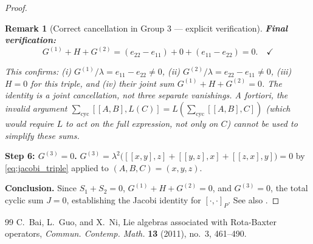 \documentclass[10pt,a4paper]{amsart}
\newtheorem{remark}{Remark}
\begin{document}
\begin{proof}
\begin{remark}[Correct cancellation in Group 3 --- explicit verification]
\medskip
\noindent\textbf{Final verification:}
\[
G^{(1)}+H+G^{(2)} = (e_{22}-e_{11}) + 0 + (e_{11}-e_{22}) = 0. \quad\checkmark
\]

This confirms: (i) $G^{(1)}/\lambda = e_{11}-e_{22} \neq 0$,
(ii) $G^{(2)}/\lambda = e_{22}-e_{11} \neq 0$,
(iii) $H = 0$ for this triple, and (iv) their joint sum $G^{(1)}+H+G^{(2)}=0$.
The identity is a \emph{joint} cancellation, not three separate vanishings.
A fortiori, the invalid argument
$\sum_{\mathrm{cyc}}[[A,B],L(C)] = L(\sum_{\mathrm{cyc}}[[A,B],C])$ (which would
require $L$ to act on the full expression, not only on $C$) cannot be used to simplify
these sums.
\end{remark}

\textbf{Step 6: $G^{(3)}=0$.}
$G^{(3)} = \lambda^2\bigl([[x,y],z]+[[y,z],x]+[[z,x],y]\bigr) = 0$
by \eqref{eq:jacobi_triple} applied to $(A,B,C)=(x,y,z)$.

\medskip
\textbf{Conclusion.} Since $S_1+S_2=0$, $G^{(1)}+H+G^{(2)}=0$, and $G^{(3)}=0$,
the total cyclic sum $J=0$, establishing the Jacobi identity for $[\cdot,\cdot]_P$.
See also \cite[Theorem~3.3]{BaiGuoNi2011}.
\end{proof}

\begin{thebibliography}{99}
 C.~Bai, L.~Guo, and X.~Ni, Lie algebras associated with Rota-Baxter operators, \textit{Commun. Contemp. Math.} \textbf{13} (2011), no.~3, 461--490.
\end{thebibliography}
\end{document}

